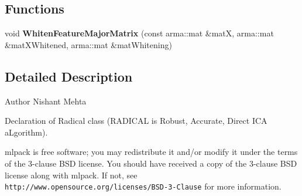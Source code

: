 \subsection*{Functions}
\begin{DoxyCompactItemize}
\item 
void \textbf{ Whiten\+Feature\+Major\+Matrix} (const arma\+::mat \&matX, arma\+::mat \&mat\+X\+Whitened, arma\+::mat \&mat\+Whitening)
\end{DoxyCompactItemize}


\subsection{Detailed Description}
\begin{DoxyAuthor}{Author}
Nishant Mehta
\end{DoxyAuthor}
Declaration of Radical class (R\+A\+D\+I\+C\+AL is Robust, Accurate, Direct I\+CA a\+Lgorithm).

mlpack is free software; you may redistribute it and/or modify it under the terms of the 3-\/clause B\+SD license. You should have received a copy of the 3-\/clause B\+SD license along with mlpack. If not, see {\tt http\+://www.\+opensource.\+org/licenses/\+B\+S\+D-\/3-\/\+Clause} for more information. 